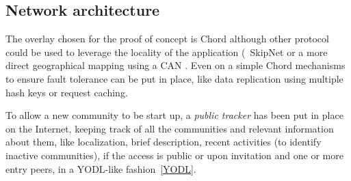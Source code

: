 \subsection{Network architecture}
%
The overlay chosen for the proof of concept is Chord\cite{chord}
although other protocol could be used to leverage the locality of the
application (\ie\ SkipNet\cite{skipnet} or a more direct geographical
mapping using a CAN \cite{CAN}.  Even on a simple Chord mechanisms to
ensure fault tolerance can be put in place, like data replication
using multiple hash keys or request caching.

To allow a new community to be start up, a \emph{public tracker} has
been put in place on the Internet, keeping track of all the
communities and relevant information about them, like localization,
brief description, recent activities (to identify inactive
communities), if the access is public or upon invitation and one or
more entry peers, in a YODL-like fashion~\ref{YODL}.